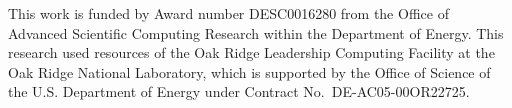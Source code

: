 \documentclass[smallextended]{svjour3}      %
\begin{document}
%

\begin{acknowledgements}
    This work is funded by Award number DESC0016280 from the Office of Advanced
    Scientific Computing Research within the Department of Energy. This
    research used resources of the Oak Ridge Leadership Computing Facility at
    the Oak Ridge National Laboratory, which is supported by the Office of
    Science of the U.S. Department of Energy under Contract
    No.\ DE-AC05-00OR22725.
\end{acknowledgements}






\end{document}
